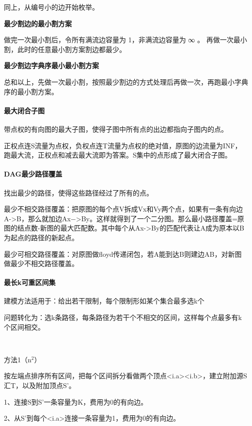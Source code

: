 \documentclass[a4paper,11pt]{article}
\begin{document}
     同上，从编号小的边开始枚举。
     
     \textbf{最少割边的最小割方案}
     
     做完一次最小割后，令所有满流边容量为 1，非满流边容量为 ∞ 。
     再做一次最小割，此时的任意最小割方案割边都最少。
     
     \textbf{最少割边字典序最小最小割方案}
     
     总和以上，先做一次最小割，按照最少割边的方式处理后再做一次，再跑最小字典序的最小割方案。
    
	\paragraph{最大闭合子图}
	带点权的有向图的最大子图，使得子图中所有点的出边都指向子图内的点。
	
	正权点连S流量为点权，负权点连T流量为点权的绝对值，原图的边流量为INF，跑最大流，正权点和减去最大流即为答案。S集中的点形成了最大闭合子图。
    
    \paragraph{DAG最少路径覆盖}
    找出最少的路径，使得这些路径经过了所有的点。
    
    最少不相交路径覆盖：把原图的每个点V拆成Vx和Vy两个点，如果有一条有向边A->B，那么就加边Ax−>By。这样就得到了一个二分图。那么最小路径覆盖=原图的结点数-新图的最大匹配数。其中每个从Ax->By的匹配代表让A成为原本以B为起点的路径的新起点。
    
   	最少可相交路径覆盖：对原图做floyd传递闭包，若A能到达B则建边AB，对新图做最少不相交路径覆盖。
   	
   	\paragraph{最长k可重区间集} 建模方法适用于：给出若干限制，每个限制形如某个集合最多选k个
   	\ 
   	
   	问题转化为：选k条路径，每条路径为若干个不相交的区间，这样每个点最多有k个区间相交。
   	
   	\
   	
   	方法1（n$^2$）
   	
   	
   	按左端点排序所有区间，把每个区间拆分看做两个顶点<i.a><i.b>，建立附加源S汇T，以及附加顶点S’。
   	
   	1、连接S到S’一条容量为K，费用为0的有向边。
   	
   	2、从S’到每个<i.a>连接一条容量为1，费用为0的有向边。
   	
\end{document}
